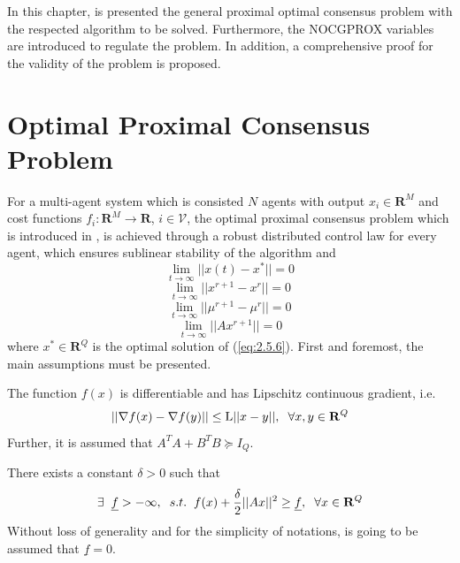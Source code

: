 In this chapter, is presented the general proximal optimal consensus problem with the respected algorithm to be solved. Furthermore, the NOCGPROX variables are introduced to regulate the problem. In addition, a comprehensive proof for the validity of the problem is proposed.

\section{Optimal Proximal Consensus Problem}

    For a multi-agent system which is consisted $N$ agents with output $x_i \in \mathbf{R}^M$ and cost functions $f_i: \mathbf{R}^M \to \mathbf{R}$, $i \in \mathcal{V}$, the optimal proximal consensus problem which is introduced in \cite{9785920}, is achieved through a robust distributed control law for every agent, which ensures sublinear stability of the algorithm and 
    \begin{equation*}
        \lim_{t \to \infty} ||x(t) - x^*|| = 0
    \end{equation*}
    \begin{equation*}
        \lim_{t \to \infty} ||x^{r+1} - x^r|| = 0
    \end{equation*}
    \begin{equation*}
        \lim_{t \to \infty} ||\mu^{r+1} - \mu^r|| = 0
    \end{equation*}
    \begin{equation*}
        \lim_{t \to \infty} ||Ax^{r+1}|| = 0
    \end{equation*}
    where $x^* \in \mathbf{R}^Q$ is the optimal solution of (\ref{eq:2.5.6}). First and foremost, the main assumptions must be presented.
    \newpage
    \begin{assumption}\label{asm:1}
        The function $f(x)$ is differentiable and has Lipschitz continuous gradient, i.e.
        \begin{equation*}
            || \nabla f(x) - \nabla f(y) || \leq \mathrm{L} ||x - y||, \hspace{2.0mm} \forall x,y \in \mathbf{R}^Q
        \end{equation*}
        Further, it is assumed that $A^TA + B^TB \succeq I_Q$.
    \end{assumption}
    
    \begin{assumption}\label{asm:2}
        There exists a constant $\delta > 0$ such that
        \begin{equation*}
            \exists \hspace{2.0mm} \underline{f} > -\infty, \hspace{2.0mm} s.t. \hspace{2.0mm} f(x) + \frac{\delta}{2}||Ax||^2 \geq \underline{f}, \hspace{2.0mm} \forall x \in \mathbf{R}^Q
        \end{equation*}
        Without loss of generality and for the simplicity of notations, is going to be assumed that $\underline{f} = 0$.
    \end{assumption}
    
